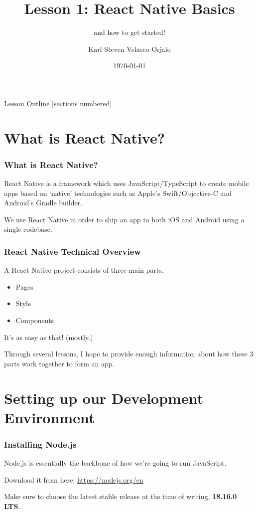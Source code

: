 \documentclass{beamer}
\title{Lesson 1: React Native Basics}
\subtitle{and how to get started!}
\date{\today}
\author{Karl Steven Velasco Orjalo}
\institute{React Native Quickstart}
\begin{document}
  \maketitle

  \begin{frame}{Lesson Outline}
    [sections numbered]
    \tableofcontents
  \end{frame}

  \section{What is React Native?}
  \begin{frame}[fragile]
    \frametitle{What is React Native?}

    React Native is a framework which uses JavaScript/TypeScript to create mobile apps based on `native' technologies such as Apple's
    Swift/Objective-C and Android's Gradle builder. 

    We use React Native in order to ship an app to both iOS and Android using a single codebase.
  \end{frame}

  \begin{frame}[fragile]
    \frametitle{React Native Technical Overview}

    A React Native project consists of three main parts.
    \begin{itemize}
      \item Pages
      \item Style
      \item Components
    \end{itemize}
    It's as easy as that! (mostly.)

    Through several lessons, I hope to provide enough information about how these 3 parts work together to form an app.
  \end{frame}


  \section{Setting up our Development Environment}
  \begin{frame}[fragile]
    \frametitle{Installing Node.js}

    Node.js is essentially the backbone of how we're going to run JavaScript.
    \newline

    Download it from here:  \url{https://nodejs.org/en}

    Make sure to choose the latest stable release at the time of writing, \textbf{18.16.0 LTS}.

  \end{frame}
\end{document}
